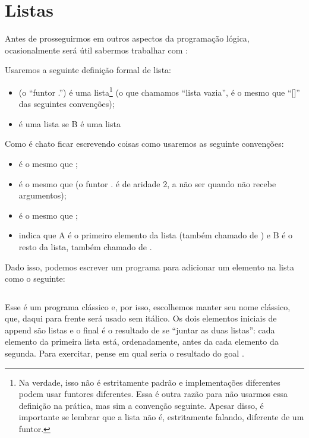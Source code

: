 \documentclass{article}
\begin{document}
\section{Listas}

Antes de prosseguirmos em outros aspectos da programação lógica, ocasionalmente será útil sabermos trabalhar com :

\begin{definition}
  Usaremos a seguinte definição formal de lista:
  \begin{itemize}
    \item {} (o ``funtor .'') é uma lista\footnote{Na verdade, isso não é estritamente padrão e implementações diferentes podem usar funtores diferentes. Essa é outra razão para não usarmos essa definição na prática, mas sim a convenção seguinte. Apesar disso, é importante se lembrar que a lista não é, estritamente falando, diferente de um funtor.} (o que chamamos ``lista vazia'', é o mesmo que ``[]'' das seguintes convenções);
    \item {} é uma lista se B é uma lista
  \end{itemize}
  Como é chato ficar escrevendo coisas como  usaremos as seguinte convenções:
  \begin{itemize}
    \item \codigo{[A,B]} é o mesmo que ;
    \item \codigo{[A]} é o mesmo que  (o funtor . é de aridade 2, a não ser quando não recebe argumentos);
    \item \codigo{[A, B, C, ...]} é o mesmo que ;
    \item \codigo{[A|B]} indica que A é o primeiro elemento da lista (também chamado de ) e B é o resto da lista, também chamado de  .
  \end{itemize}
\end{definition}

Dado isso, podemos escrever um programa para adicionar um elemento na lista como o seguinte:

\begin{listing}[ht]
\inputminted{prolog}{../Exemplos/Cap2/prog2_append.pl}\label{lst:append}
\end{listing}

Esse é um programa clássico e, por isso, escolhemos manter seu nome clássico, que, daqui para frente será usado sem itálico. Os dois elementos iniciais de append são listas e o final é o resultado de se ``juntar as duas listas'': cada elemento da primeira lista está, ordenadamente, antes da cada elemento da segunda. Para exercitar, pense em qual seria o resultado do goal .
\end{document}
